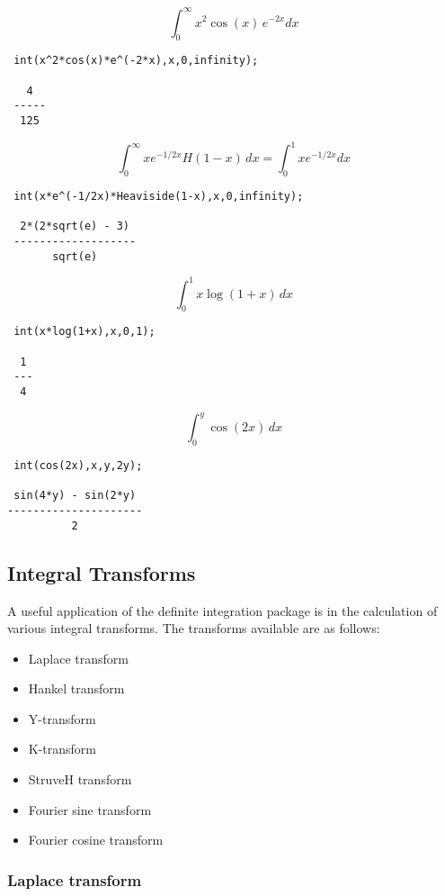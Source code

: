 \[
\int_{0}^{\infty} x^2 \cos(x) \, e^{-2x} dx
\]

\begin{verbatim}
 int(x^2*cos(x)*e^(-2*x),x,0,infinity);

   4
 -----
  125
\end{verbatim}

\[
\int_{0}^{\infty} x e^{-1/2x} H(1-x) \,dx = \int_{0}^{1} x e^{-1/2x} dx
\]

\begin{verbatim}
 int(x*e^(-1/2x)*Heaviside(1-x),x,0,infinity);

  2*(2*sqrt(e) - 3)
 -------------------
       sqrt(e)
\end{verbatim}

\[
\int_{0}^{1} x \log(1+x) \,dx
\]

\begin{verbatim}
 int(x*log(1+x),x,0,1);

  1
 ---
  4
\end{verbatim}

\[
\int_{0}^{y} \cos(2x) \,dx
\]

\begin{verbatim}
 int(cos(2x),x,y,2y);

 sin(4*y) - sin(2*y)
---------------------
          2
\end{verbatim}


\subsection{Integral Transforms}

A useful application of the definite integration package is in the
calculation of various integral transforms. The transforms
available are as follows:

\begin{itemize}
\item Laplace transform
\item Hankel transform
\item Y-transform
\item K-transform
\item StruveH transform
\item Fourier sine transform
\item Fourier cosine transform
\end{itemize}

\subsubsection{Laplace transform}
\hypertarget{operator:LAPLACE_TRANSFORM}{}

